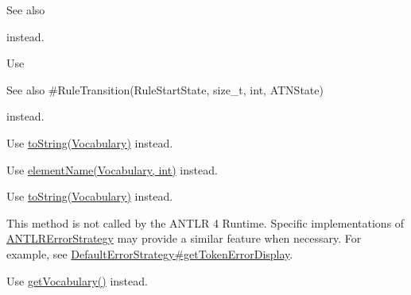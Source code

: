 \begin{DoxyRefList}
\begin{DoxySeeAlso}{See also}
\end{DoxySeeAlso}
instead.  
\item[\label{deprecated__deprecated000006}%
\Hypertarget{deprecated__deprecated000006}%
Member \hyperlink{classantlr4_1_1atn_1_1RuleTransition_a231adc7c039edce028eacf27526bd6b2}{antlr4\+:\+:atn\+:\+:Rule\+Transition\+:\+:Rule\+Transition} (\hyperlink{classantlr4_1_1atn_1_1RuleStartState}{Rule\+Start\+State} $\ast$rule\+Start, size\+\_\+t rule\+Index, A\+T\+N\+State $\ast$follow\+State)]Use \begin{DoxySeeAlso}{See also}
\#\+Rule\+Transition(\+Rule\+Start\+State, size\+\_\+t, int, A\+T\+N\+State)


\end{DoxySeeAlso}
instead.  
\item[\label{deprecated__deprecated000007}%
\Hypertarget{deprecated__deprecated000007}%
Member \hyperlink{classantlr4_1_1dfa_1_1DFA_adae4f569d3075101ae3571fe67748b56}{antlr4\+:\+:dfa\+:\+:D\+FA\+:\+:to\+String} (const std\+::vector$<$ std\+::string $>$ \&token\+Names)]Use \hyperlink{}{to\+String(\+Vocabulary)} instead.  
\item[\label{deprecated__deprecated000009}%
\Hypertarget{deprecated__deprecated000009}%
Member \hyperlink{classantlr4_1_1misc_1_1IntervalSet_a10334d09c666f59ced45f43b9cd2772a}{antlr4\+:\+:misc\+:\+:Interval\+Set\+:\+:element\+Name} (const std\+::vector$<$ std\+::string $>$ \&token\+Names, ssize\+\_\+t a) const]Use \hyperlink{}{element\+Name(\+Vocabulary, int)} instead.  
\item[\label{deprecated__deprecated000008}%
\Hypertarget{deprecated__deprecated000008}%
Member \hyperlink{classantlr4_1_1misc_1_1IntervalSet_aca1798065f0f309e559c6c6efc07b6b1}{antlr4\+:\+:misc\+:\+:Interval\+Set\+:\+:to\+String} (const std\+::vector$<$ std\+::string $>$ \&token\+Names) const]Use \hyperlink{}{to\+String(\+Vocabulary)} instead.  
\item[\label{deprecated__deprecated000011}%
\Hypertarget{deprecated__deprecated000011}%
Member \hyperlink{classantlr4_1_1Recognizer_a4f7740ffef4e68ea219a3f3103281e1d}{antlr4\+:\+:Recognizer\+:\+:get\+Token\+Error\+Display} (\hyperlink{classantlr4_1_1Token}{Token} $\ast$t)]This method is not called by the A\+N\+T\+LR 4 Runtime. Specific implementations of \hyperlink{classantlr4_1_1ANTLRErrorStrategy}{A\+N\+T\+L\+R\+Error\+Strategy} may provide a similar feature when necessary. For example, see \hyperlink{}{Default\+Error\+Strategy\#get\+Token\+Error\+Display}.  
\item[\label{deprecated__deprecated000010}%
\Hypertarget{deprecated__deprecated000010}%
Member \hyperlink{classantlr4_1_1Recognizer_aef9436cfc73e828229b90a57c8ff2493}{antlr4\+:\+:Recognizer\+:\+:get\+Token\+Names} () const =0]Use \hyperlink{classantlr4_1_1Recognizer_aae7ec953d3f35749e62ccb96fa3e0946}{get\+Vocabulary()} instead.  
\item[\label{deprecated__deprecated000012}%
\Hypertarget{deprecated__deprecated000012}%
Member \hyperlink{classantlr4_1_1tree_1_1Trees_a5eda3fa3fdcf06c495254f71d8cdb9ee}{antlr4\+:\+:tree\+:\+:Trees\+:\+:descendants} (\hyperlink{classantlr4_1_1tree_1_1ParseTree}{Parse\+Tree} $\ast$t)]
\end{DoxyRefList}